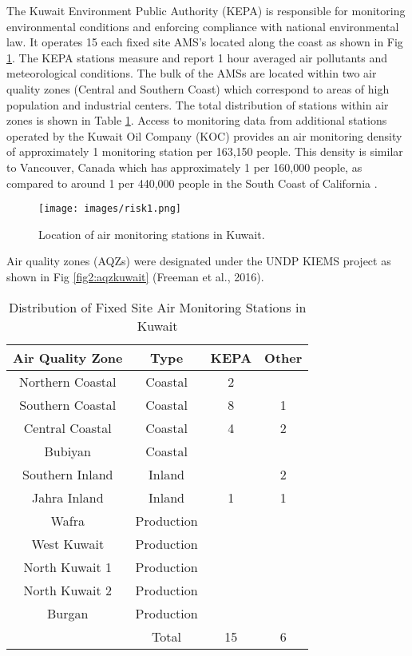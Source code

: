 The Kuwait Environment Public Authority (KEPA) is responsible for monitoring environmental conditions and enforcing compliance with national environmental law. It operates 15 each fixed site AMS’s located along the coast as shown in Fig \ref{fig1:amskuwait}.  The KEPA stations measure and report 1 hour averaged air pollutants and meteorological conditions. The bulk of the AMSs are located within two air quality zones (Central and Southern Coast) which correspond to areas of high population and industrial centers. The total distribution of stations within air zones is shown in Table \ref{tb:2ams}. Access to monitoring data from additional stations operated by the Kuwait Oil Company (KOC) provides an air monitoring density of approximately 1 monitoring station per 163,150 people. This density is similar to Vancouver, Canada which has approximately 1 per 160,000 people, as compared to around 1 per 440,000 people in the South Coast of California \citep{Marshall2008}.
%  
\begin{figure}
\texttt{[image: images/risk1.png]} 
\caption{Location of air monitoring stations in Kuwait.}
\label{fig1:amskuwait}
\end{figure}
%
Air quality zones (AQZs) were designated under the UNDP KIEMS project as shown in Fig \ref{fig2:aqzkuwait} (Freeman et al., 2016).
%
\begin{table}[!htb]
\centering
\caption{Distribution of Fixed Site Air Monitoring Stations in Kuwait}
\label{tb:2ams}
\begin{tabular}{@{}cccc@{}}
\toprule
\textbf{Air Quality Zone} & \textbf{Type} & \textbf{KEPA} & \textbf{Other} \\ \midrule
Northern Coastal & Coastal & 2 &  \\
Southern Coastal & Coastal & 8 & 1 \\
Central Coastal & Coastal & 4 & 2 \\
Bubiyan & Coastal &  &  \\
Southern Inland & Inland &  & 2 \\
Jahra Inland & Inland & 1 & 1 \\
Wafra & Production &  &  \\
West Kuwait & Production &  &  \\
North Kuwait 1 & Production &  &  \\
North Kuwait 2 & Production &  &  \\
Burgan & Production &  &  \\
 & Total & 15 & 6 \\ \bottomrule
\end{tabular}
\end{table}

